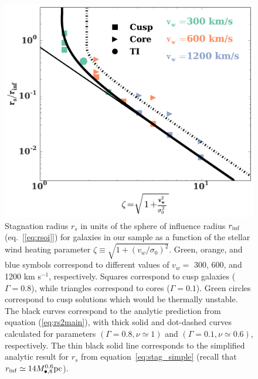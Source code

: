\documentclass[usenatbib,fleqn]{mn2e}
\newcommand{\rs}{r_s}
\newcommand{\Mbheight}{M_{\bullet,8}}
\newcommand{\rinf}{r_{\rm inf}}
\newcommand{\densSlope}{\nu}
\begin{document}
\begin{figure}
  \includegraphics[width=\columnwidth]{rs.pdf}
  \caption{\label{fig:stag} Stagnation radius $r_{s}$ in units of the
    sphere of influence radius $r_{\rm inf}$ (eq.~[\ref{eq:rsoi}]) for
    galaxies in our sample as a function of the stellar wind heating
    parameter $\zeta \equiv \sqrt{1+(v_w/\sigma_0)^{2}}$.  Green,
    orange, and blue symbols correspond to different values of $v_{w}
    =$ 300, 600, and 1200 km s$^{-1}$, respectively.  Squares
    correspond to cusp galaxies ($\Gamma = 0.8$), while triangles
    correspond to cores ($\Gamma = 0.1$). Green circles correspond to
    cusp solutions which would be thermally unstable.  The black
    curves correspond to the analytic prediction from equation
    (\ref{eq:rs2main}), with thick solid and dot-dashed curves
    calculated for parameters $(\Gamma=0.8, \densSlope\simeq 1)$ and
    $(\Gamma=0.1,\densSlope\simeq0.6)$, respectively. The thin black
    solid line corresponds to the simplified analytic result for $\rs$
    from equation~\eqref{eq:stag_simple} (recall that $\rinf \simeq 14
    \Mbheight^{0.6} {\rm pc}$).}
\end{figure}
\end{document}
